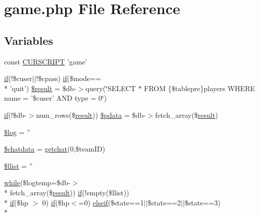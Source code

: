 \hypertarget{game_8php}{\section{game.\+php File Reference}
\label{game_8php}
}
\subsection*{Variables}
\begin{DoxyCompactItemize}
\item 
const \hyperlink{game_8php_a39c39f525eceb86cabc338804f230e80}{C\+U\+R\+S\+C\+R\+I\+P\+T} 'game'
\item 
\hyperlink{login__old_8php_a4ac1118c2e44c513a674bc1793ba6c90}{if}(!\$cuser$\vert$$\vert$!\$cpass) \hyperlink{login__old_8php_a4ac1118c2e44c513a674bc1793ba6c90}{if}(\$mode== \\*
'quit') \hyperlink{game_8php_a112ef069ddc0454086e3d1e6d8d55d07}{\$result} = \$db-\/$>$query(\char`\"{}S\+E\+L\+E\+C\+T $\ast$ F\+R\+O\+M \{\$tablepre\}players W\+H\+E\+R\+E name = '\$cuser' A\+N\+D type = 0\char`\"{})
\item 
\hyperlink{login__old_8php_a4ac1118c2e44c513a674bc1793ba6c90}{if}(!\$db-\/$>$num\+\_\+rows(\$\hyperlink{templates_2install_8php_abdecde238169a1e34f68354fc9968af0}{result})) \hyperlink{game_8php_a6378350bbbdfdf1fdd8c8e1cd0607a8d}{\$pdata} = \$db-\/$>$fetch\+\_\+array(\$\hyperlink{templates_2install_8php_abdecde238169a1e34f68354fc9968af0}{result})
\item 
\hyperlink{game_8php_a9a2cf15a653aee8be437f7ae474cd494}{\$log} = ''
\item 
\hyperlink{game_8php_ab6c9112e16f75e62bbdb511dbd0a1ff9}{\$chatdata} = \hyperlink{global_8func_8php_ae94634fa76d1fade04d484f05496a1ed}{getchat}(0,\$team\+I\+D)
\item 
\hyperlink{game_8php_a5d54a0278e200a0ff8007926c5dd2a10}{\$llist} = ''
\item 
\hyperlink{stat_8php_ab54633a8fada54bedd1fe3c2635cfaeb}{while}(\$logtemp=\$db-\/$>$\\*
fetch\+\_\+array(\$\hyperlink{templates_2install_8php_abdecde238169a1e34f68354fc9968af0}{result})) \hyperlink{login__old_8php_a4ac1118c2e44c513a674bc1793ba6c90}{if}(!empty(\$llist)) \\*
\hyperlink{login__old_8php_a4ac1118c2e44c513a674bc1793ba6c90}{if}(\$hp $>$ 0) \hyperlink{login__old_8php_a4ac1118c2e44c513a674bc1793ba6c90}{if}(\$hp$<$=0) \hyperlink{urlist_8php_a77f52b43f81ed05a41b68c2161789055}{elseif}(\$state==1$\vert$$\vert$\$state==2$\vert$$\vert$\$state==3) \\*
$$
\end{DoxyCompactItemize}
